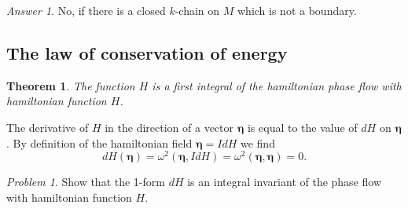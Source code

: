 \documentclass{book}
\numberwithin{equation}{section}
\theoremstyle{plain}
\newtheorem*{thm*}{Theorem}
\let\oldendproof\endproof
\renewenvironment{proof}[1][\proofname]{%
  \oldproof[\textsc{#1}]%
}{\oldendproof}
\theoremstyle{definition}
\theoremstyle{remark}
\theoremstyle{smallcap}
\newtheorem*{prob*}{Problem}
\numberwithin{prob}{section}
\newtheorem*{ans*}{Answer}
\begin{document}
\begin{ans*}
  No, if there is a closed $k$-chain on $M$ which is not a boundary.
\end{ans*}


\subsection{The law of conservation of energy}

\begin{thm*}
  The function $H$ is a first integral of the hamiltonian phase flow
  with hamiltonian function $H$.
\end{thm*}

\begin{proof}
  The derivative of $H$ in the direction of a vector $\pmb\eta$
  is equal to the value of $dH$ on $\pmb\eta$.
  By definition of the hamiltonian field
  $\pmb\eta = IdH$ we find
  $$
  dH(\pmb\eta) = \omega^2(\pmb\eta, IdH)
  = \omega^2(\pmb\eta, \pmb\eta) = 0.
  $$
\end{proof}

\begin{prob*}
  Show that the 1-form $dH$ is an integral invariant
  of the phase flow with hamiltonian function $H$.

\end{prob*}
\end{document}
